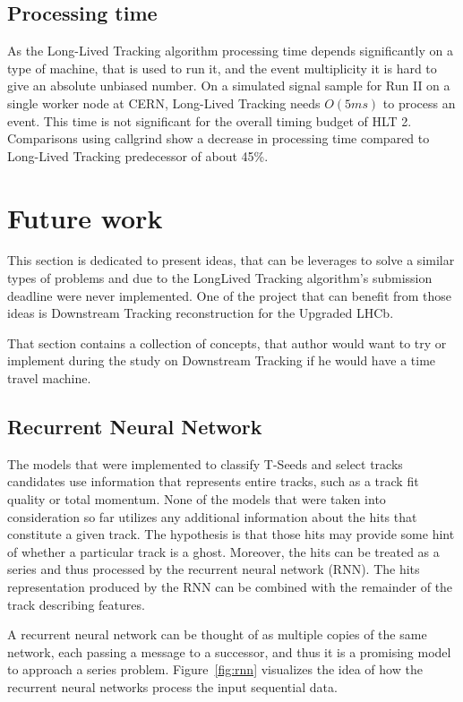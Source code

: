 \subsection{Processing time}

As the Long-Lived Tracking algorithm processing time depends significantly on a type of machine, that is used to run it, and the event multiplicity it is hard to give an absolute unbiased number. On a simulated signal sample for Run II on a single worker node at CERN, Long-Lived Tracking needs $O(5 ms)$ to process an event. This time is not significant for the overall timing budget of HLT 2.
Comparisons using callgrind show a decrease in processing time compared to Long-Lived Tracking predecessor of about 45\%.

\section{Future work}
This section is dedicated to present ideas, that can be leverages to solve a similar types of problems and due to the LongLived Tracking algorithm's submission deadline were never implemented. One of the project that can benefit from those ideas is Downstream Tracking reconstruction for the Upgraded LHCb. 

That section contains a collection of concepts, that author would want to try or implement during the study on Downstream Tracking if he would have a time travel machine.

\subsection{Recurrent Neural Network}
The models that were implemented to classify T-Seeds and select tracks candidates use information that represents entire tracks, such as a track fit quality or total momentum. None of the models that were taken into consideration so far utilizes any additional information about the hits that constitute a given track. The hypothesis is that those hits may provide some hint of whether a particular track is a ghost. 
Moreover, the hits can be treated as a series and thus processed by the recurrent neural network (RNN). The hits representation produced by the RNN can be combined with the remainder of the track describing features. 

A recurrent neural network can be thought of as multiple copies of the same network, each passing a message to a successor, and thus it is a promising model to approach a series problem. Figure~\ref{fig:rnn} visualizes the idea of how the recurrent neural networks process the input sequential data. 

